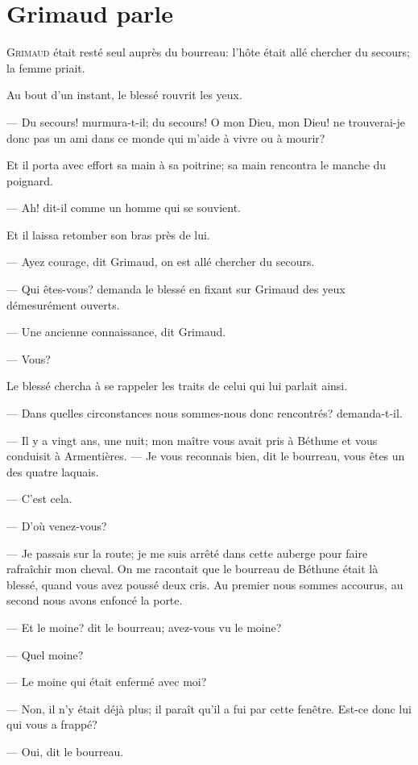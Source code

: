 \chapter{Grimaud parle}

\lettrine{G}{rimaud} était resté seul auprès du bourreau: l'hôte était allé chercher du secours; la femme priait.

\zz
Au bout d'un instant, le blessé rouvrit les yeux.

\zz
— Du secours! murmura-t-il; du secours! O mon Dieu, mon Dieu! ne trouverai-je donc pas un ami dans ce monde qui m'aide à vivre ou à mourir?

Et il porta avec effort sa main à sa poitrine; sa main rencontra le manche du poignard.

— Ah! dit-il comme un homme qui se souvient.

Et il laissa retomber son bras près de lui.

— Ayez courage, dit Grimaud, on est allé chercher du secours.

— Qui êtes-vous? demanda le blessé en fixant sur Grimaud des yeux démesurément ouverts.

— Une ancienne connaissance, dit Grimaud.

— Vous?

Le blessé chercha à se rappeler les traits de celui qui lui parlait ainsi.

— Dans quelles circonstances nous sommes-nous donc rencontrés? demanda-t-il.

— Il y a vingt ans, une nuit; mon maître vous avait pris à Béthune et vous conduisit à Armentières.
— Je vous reconnais bien, dit le bourreau, vous êtes un des quatre laquais.

— C'est cela.

— D'où venez-vous?

— Je passais sur la route; je me suis arrêté dans cette auberge pour faire rafraîchir mon cheval. On me racontait que le bourreau de Béthune était là blessé, quand vous avez poussé deux cris. Au premier nous sommes accourus, au second nous avons enfoncé la porte.

— Et le moine? dit le bourreau; avez-vous vu le moine?

— Quel moine?

— Le moine qui était enfermé avec moi?

— Non, il n'y était déjà plus; il paraît qu'il a fui par cette fenêtre. Est-ce donc lui qui vous a frappé?

— Oui, dit le bourreau.

